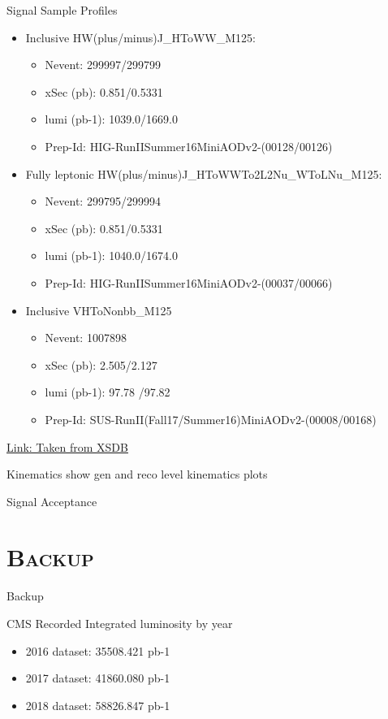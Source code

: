 \documentclass[xcolor=dvipsnames,compress]{beamer}
\begin{document}
\begin{frame}{Signal Sample Profiles}
\begin{itemize}
\item{Inclusive HW(plus/minus)J\_HToWW\_M125:}
\begin{itemize}
\item{Nevent: 299997/299799}
\item{xSec (pb): 0.851/0.5331}
\item{lumi (pb-1): 1039.0/1669.0}
\item{Prep-Id: HIG-RunIISummer16MiniAODv2-(00128/00126)}
\end{itemize}
\item{Fully leptonic HW(plus/minus)J\_HToWWTo2L2Nu\_WToLNu\_M125:}
\begin{itemize}
\item{Nevent: 299795/299994}
\item{xSec (pb): 0.851/0.5331}
\item{lumi (pb-1): 1040.0/1674.0}
\item{Prep-Id: HIG-RunIISummer16MiniAODv2-(00037/00066)}
\end{itemize}
\item{Inclusive VHToNonbb\_M125}
\begin{itemize}
\item{Nevent: 1007898}
\item{xSec (pb): 2.505/2.127	}
\item{lumi (pb-1): 97.78	/97.82}
\item{Prep-Id: SUS-RunII(Fall17/Summer16)MiniAODv2-(00008/00168)}
\end{itemize}
\end{itemize}
\href{https://cms-gen-dev.cern.ch/xsdb/?columns=67108863&currentPage=0&ordDirection=-1&ordFieldName=cross_section&pageSize=10&searchQuery=process_name\%20\%3D\%20HWplusJ_HToWWTo2L2Nu_WToLNu_M125_13TeV_powheg_pythia8\%20\%7C\%7C\%20process_name\%20\%3D\%20HWminusJ_HToWWTo2L2Nu_WToLNu_M125_13TeV_powheg_pythia8\%20\%7C\%7C\%20process_name\%20\%3D\%20HWminusJ_HToWW_M125_13TeV_powheg_pythia8\%20\%7C\%7C\%20process_name\%20\%3D\%20HWplusJ_HToWW_M125_13TeV_powheg_pythia8\%20\%7C\%7C\%20process_name\%20\%3D\%20VHToNonbb_M125_13TeV_amcatnloFXFX_madspin_pythia8}{Link: Taken from XSDB}
\end{frame}

\begin{frame}{Kinematics}
show gen and reco level kinematics plots
\end{frame}

\begin{frame}{Signal Acceptance}

\end{frame}

\section{\scshape Backup}
\begin{frame}
\centering
\Huge{Backup}
\end{frame}

\begin{frame}{CMS Recorded Integrated luminosity by year}
\begin{itemize}
\item{2016 dataset: 35508.421 pb-1}
\item{2017 dataset: 41860.080 pb-1}
\item{2018 dataset: 58826.847 pb-1}
\end{itemize}
\end{frame}
\end{document}
